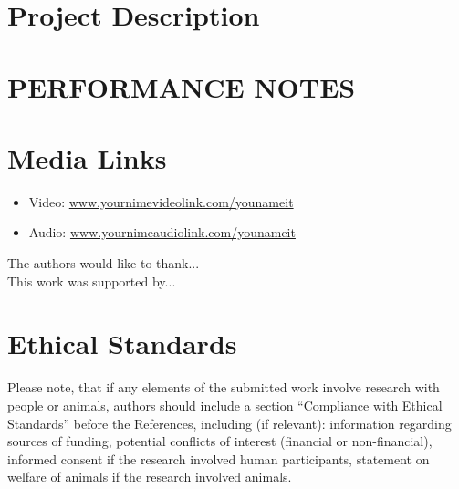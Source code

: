 \documentclass{nimemusic}
\begin{document}
\section{Project Description}
\lipsum[2]

\section{PERFORMANCE NOTES}
\lipsum[3]

\section{Media Links}

\begin{itemize}
	\item Video: \url{www.yournimevideolink.com/younameit}
	\item Audio: \url{www.yournimeaudiolink.com/younameit}
\end{itemize}


\begin{acks}
The authors would like to thank...
\\
This work was supported by...
\end{acks}

\section*{Ethical Standards}
Please note, that if any elements of the submitted work involve research with people or animals, authors should include a section “Compliance with Ethical Standards” before the References, including (if relevant): information regarding sources of funding, potential conflicts of interest (financial or non-financial),  informed consent if the research involved human participants, statement on welfare of animals if the research involved animals.



\end{document}

